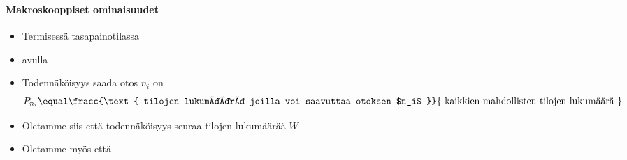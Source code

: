 \begin{frame}
\frametitle{\texorpdfstring{\culine[\sectiontitleulinecolor]{\sectiontitle}}{\sectiontitle} }
\framesubtitle{Makroskooppiset ominaisuudet}
\appear{}
\begin{itemize}
	\item Termisessä tasapainotilassa

\item  {} avulla   

\item Todennäköisyys saada otos $n_i$ on
\[ 
 P_{n_i} \equal \fracc{\text { tilojen lukumäärä joilla voi saavuttaa otoksen $n_i$ }}{\text { kaikkien mahdollisten tilojen lukumäärä }} 
 \]
\item Oletamme siis että todennäköisyys seuraa tilojen lukumäärää $W$ 

\item Oletamme myös että  
%
\end{itemize}

\endofslide 
\end{frame}

